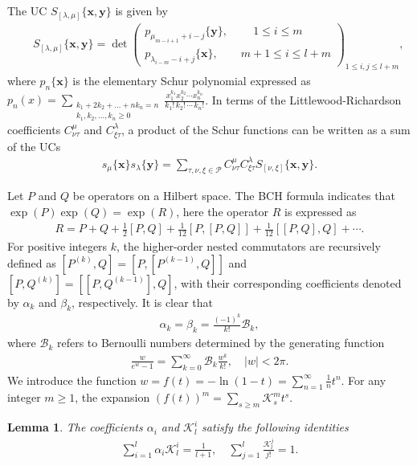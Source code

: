\documentclass[10pt,a4paper]{amsart}
\numberwithin{equation}{section}
\newtheorem{lemma}[theorem]{Lemma}
\begin{document}
The UC $S_{[\lambda,\mu]}\{\mathbf{x,y}\}$ is given by
\begin{eqnarray}
&&S_{[\lambda,\mu]}\{\mathbf{x,y}\}=\det
\left(\begin{array}{lll}
p_{\mu_{m-i+1}+i-j}\{\mathbf{y}\},\quad \quad  \ 1\leq i\leq m\\
p_{\lambda_{i-m}-i+j}\{\mathbf{x}\},\quad \quad m+1\leq i\leq l+m
\end{array}\right)_{1\leq i,j\leq l+m},
\end{eqnarray}
where $p_{n}\{\mathbf{x}\}$ is the elementary Schur polynomial expressed as $p_n(x) = \sum\limits_{\substack{k_1 + 2k_2 + \dots + n k_n = n \\ k_1, k_2, \dots, k_n \ge 0}} \frac{x_1^{k_1} x_2^{k_2} \cdots x_n^{k_n}}{k_1! \, k_2! \, \cdots \, k_n!}$. In terms of the Littlewood-Richardson coefficients $C^{\mu}_{\nu\tau}$ and $C^{\lambda}_{\xi\tau}$, a product of the Schur functions can be written as a sum of the UCs
\begin{eqnarray}
s_{\mu}\{\mathbf{x}\}s_{\lambda}\{\mathbf{y}\}=
\sum\limits_{\tau,\nu,\xi\in\mathcal{P}}C^{\mu}_{\nu\tau}C^{\lambda}_{\xi\tau}
S_{[\nu,\xi]}\{\mathbf{x},\mathbf{y}\}.
\end{eqnarray}



 Let $P$ and $Q$ be operators on a Hilbert space. The BCH formula  indicates that $\exp(P)\exp(Q)=\exp(R)$, here the operator $R$ is expressed as
\begin{eqnarray}
R=P+Q+\frac{1}{2}[P,Q]+\frac{1}{12}[P,[P,Q]]+\frac{1}{12}[[P,Q],Q]+\cdots.
\end{eqnarray}
For positive integers $k$, the higher-order nested commutators are recursively defined as $[P^{(k)},Q]=[P,[P^{(k-1)},Q]]$ and $[P,Q^{(k)}]=[[P,Q^{(k-1)}],Q]$, with their corresponding coefficients denoted by $\alpha_{k}$ and $\beta_{k}$, respectively. It is clear that
\begin{eqnarray}
\alpha_{k}=\beta_{k}=\frac{(-1)^{k}}{k!}\mathcal{B}_{k},
\end{eqnarray}
where $\mathcal{B}_{k}$  refers to Bernoulli numbers determined by the generating
function
\begin{eqnarray} \frac{w}{e^{w}-1}=\sum\limits_{k=0}^{\infty}\mathcal{B}_{k}\frac{w^{k}}{k!},
\quad|w|<2\pi.
\end{eqnarray}
We introduce the function $w=f(t)=-\ln(1-t)=\sum\limits_{n=1}^{\infty}\frac{1}{n}t^{n}$. For any integer $m\geq1$, the expansion  $(f(t))^{m}=\sum\limits_{s\geq m}\mathcal{K}_{s}^{m}t^{s}$.
\begin{lemma}
The coefficients $\alpha_{i}$ and $\mathcal{K}_{l}^{i}$ satisfy the following identities
\begin{eqnarray}
\sum\limits_{i=1}^{l}\alpha_{i}\mathcal{K}_{l}^{i}=\frac{1}{l+1},\quad \sum\limits_{j=1}^{l}\frac{\mathcal{K}_{l}^{j}}{j!}=1.
\end{eqnarray}
\end{lemma}
\end{document}

